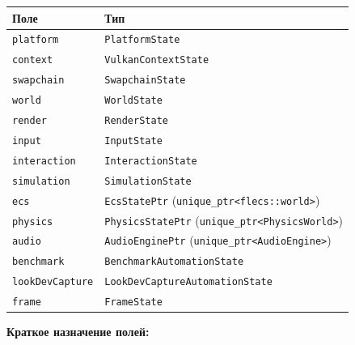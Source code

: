 \begin{longtable}[]{@{}ll@{}}
\toprule\noalign{}
Поле & Тип \\
\midrule\noalign{}
\endhead
\bottomrule\noalign{}
\endlastfoot
\texttt{platform} & \texttt{PlatformState} \\
\texttt{context} & \texttt{VulkanContextState} \\
\texttt{swapchain} & \texttt{SwapchainState} \\
\texttt{world} & \texttt{WorldState} \\
\texttt{render} & \texttt{RenderState} \\
\texttt{input} & \texttt{InputState} \\
\texttt{interaction} & \texttt{InteractionState} \\
\texttt{simulation} & \texttt{SimulationState} \\
\texttt{ecs} & \texttt{EcsStatePtr} (\texttt{unique\_ptr\textless{}flecs::world\textgreater{}}) \\
\texttt{physics} & \texttt{PhysicsStatePtr} (\texttt{unique\_ptr\textless{}PhysicsWorld\textgreater{}}) \\
\texttt{audio} & \texttt{AudioEnginePtr} (\texttt{unique\_ptr\textless{}AudioEngine\textgreater{}}) \\
\texttt{benchmark} & \texttt{BenchmarkAutomationState} \\
\texttt{lookDevCapture} & \texttt{LookDevCaptureAutomationState} \\
\texttt{frame} & \texttt{FrameState} \\
\end{longtable}

\textbf{Краткое назначение полей:}

